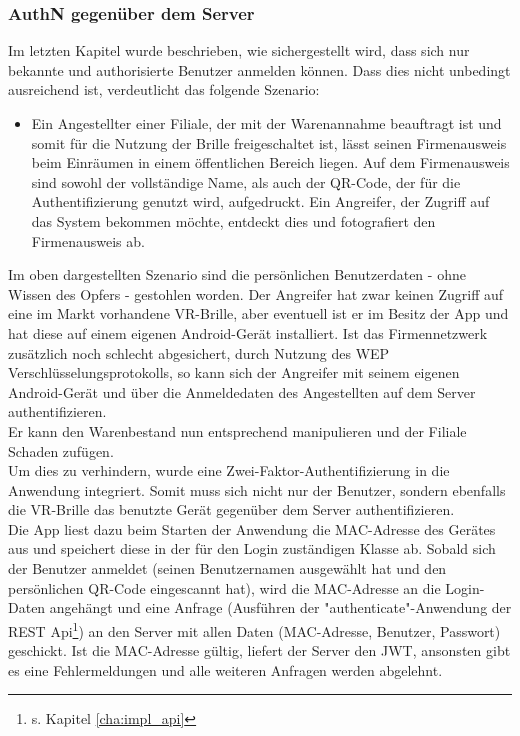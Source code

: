 \subsubsection{\acs{AuthN} gegenüber dem Server}
\label{cha:authn_server}
Im letzten Kapitel wurde beschrieben, wie sichergestellt wird, dass sich nur bekannte und authorisierte Benutzer anmelden können. Dass dies nicht unbedingt ausreichend ist, verdeutlicht das folgende Szenario:
\begin{itemize}
	\item Ein Angestellter einer Filiale, der mit der Warenannahme beauftragt ist und somit für die Nutzung der Brille freigeschaltet ist, lässt seinen Firmenausweis beim Einräumen in einem öffentlichen Bereich liegen. Auf dem Firmenausweis sind sowohl der vollständige Name, als auch der QR-Code, der für die Authentifizierung genutzt wird, aufgedruckt. Ein Angreifer, der Zugriff auf das System bekommen möchte, entdeckt dies und fotografiert den Firmenausweis ab.
\end{itemize}
Im oben dargestellten Szenario sind die persönlichen Benutzerdaten - ohne Wissen des Opfers - gestohlen worden. Der Angreifer hat zwar keinen Zugriff auf eine im Markt vorhandene \ac{VR}-Brille, aber eventuell ist er im Besitz der App und hat diese auf einem eigenen Android-Gerät installiert. Ist das Firmennetzwerk zusätzlich noch schlecht abgesichert, \zB durch Nutzung des \ac{WEP} Verschlüsselungsprotokolls, so kann sich der Angreifer mit seinem eigenen Android-Gerät und über die Anmeldedaten des Angestellten auf dem Server authentifizieren.\\
Er kann den Warenbestand nun entsprechend manipulieren und der Filiale Schaden zufügen.\\

Um dies zu verhindern, wurde eine Zwei-Faktor-Authentifizierung in die Anwendung integriert. Somit muss sich nicht nur der Benutzer, sondern ebenfalls die \ac{VR}-Brille \bzw das benutzte Gerät gegenüber dem Server authentifizieren.\\

Die App liest dazu beim Starten der Anwendung die \ac{MAC}-Adresse des Gerätes aus und speichert diese in der für den Login zuständigen Klasse ab. Sobald sich der Benutzer anmeldet (seinen Benutzernamen ausgewählt hat und den persönlichen QR-Code eingescannt hat), wird die \ac{MAC}-Adresse an die Login-Daten angehängt und eine Anfrage (Ausführen der "authenticate"-Anwendung der REST Api\footnote{s. Kapitel \ref{cha:impl_api}}) an den Server mit allen Daten (\ac{MAC}-Adresse, Benutzer, Passwort) geschickt. Ist die \ac{MAC}-Adresse gültig, liefert der Server den \ac{JWT}, ansonsten gibt es eine Fehlermeldungen und alle weiteren Anfragen werden abgelehnt.\\

